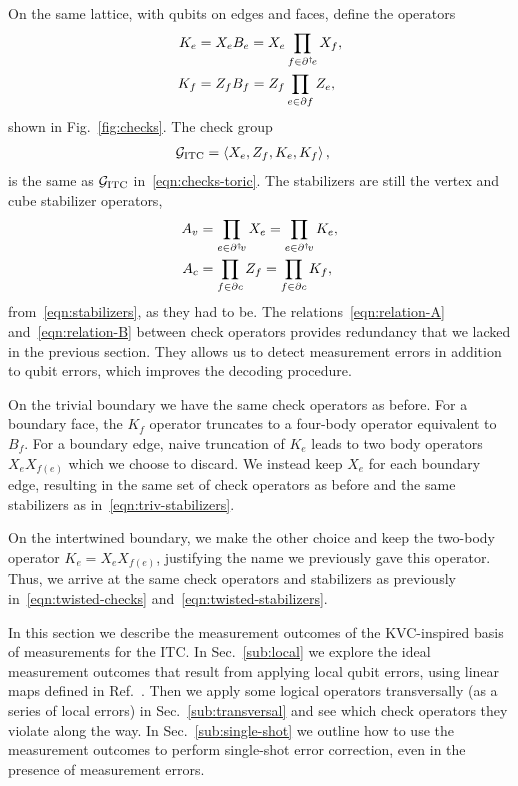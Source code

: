 On the same lattice, with qubits on edges and faces, define the operators 
\begin{align}
K_e &= X_e B_e = X_e \prod_{f\in \partial^\dagger\! e} X_f, \\
K_f &= Z_f B_f = Z_f \prod_{e \in \partial f} Z_e,
\end{align}
shown in Fig.~\ref{fig:checks}.
The check group
\begin{align}
\mathcal{G}_{\text{ITC}} &= \left\langle X_e, Z_f,  K_e, K_f \right\rangle, \label{eqn:checks-color}
\end{align}
is the same as $\mathcal{G}_{\text{ITC}}$ in~\eqref{eqn:checks-toric}.
The stabilizers are still the vertex and cube stabilizer operators,
\begin{align}
A_v &= \prod_{e \in \partial^\dagger\! v} X_e = \prod_{e \in \partial^\dagger\! v} K_e, \label{eqn:relation-A} \\
A_c &= \prod_{f \in \partial c} Z_f = \prod_{f \in \partial c} K_f,  \label{eqn:relation-B}
\end{align}
from~\eqref{eqn:stabilizers}, as they had to be.
The relations~\eqref{eqn:relation-A} and~\eqref{eqn:relation-B} between check operators provides redundancy that we lacked in the previous section. They allows us to detect measurement errors in addition to qubit errors, which improves the decoding procedure.

On the trivial boundary we have the same check operators as before. For a boundary face, the $K_f$ operator truncates to a four-body operator equivalent to $B_f$. For a boundary edge, naive truncation of $K_e$ leads to two body operators $X_e X_{f(e)}$ which we choose to discard. We instead keep $X_e$ for each boundary edge, resulting in the same set of check operators as before and the same stabilizers as in~\eqref{eqn:triv-stabilizers}.

On the intertwined boundary, we make the other choice and keep the two-body operator $K_e = X_e X_{f(e)}$, justifying the name we previously gave this operator. Thus, we arrive at the same check operators and stabilizers as previously in~\eqref{eqn:twisted-checks} and~\eqref{eqn:twisted-stabilizers}. 

In this section we describe the measurement outcomes of the KVC-inspired basis of measurements for the ITC. In Sec.~\ref{sub:local} we explore the ideal measurement outcomes that result from applying local qubit errors, using linear maps defined in Ref.~\cite{KubicaVasmer2022}. Then we apply some logical operators transversally (as a series of local errors) in Sec.~\ref{sub:transversal} and see which check operators they violate along the way. In Sec.~\ref{sub:single-shot} we outline how to use the measurement outcomes to perform single-shot error correction, even in the presence of measurement errors.

